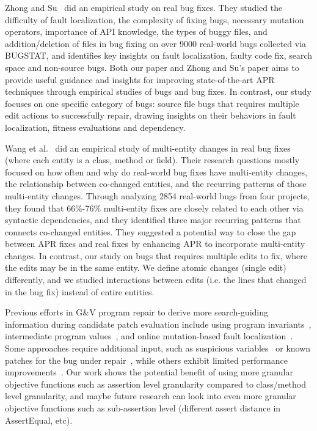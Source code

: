 \documentclass[sigconf, timestamp-false, anonymous=true]{acmart}
\begin{document}
Zhong and Su~\cite{zhong2015} did an empirical study on real bug fixes. 
They studied the difficulty of fault localization, the complexity of fixing bugs, 
necessary mutation operators, importance of API knowledge, the types of buggy files, 
and addition/deletion of files in bug fixing on over 9000 real-world bugs collected via BUGSTAT, 
and identifies key insights on fault localization, faulty code fix, search space and non-source bugs. 
Both our paper and Zhong and Su's paper aims to provide useful guidance and insights for 
improving state-of-the-art APR techniques through empirical studies of bugs and bug fixes. 
In contrast, our study focuses on one specific category of bugs: 
source file bugs that requires multiple edit actions to successfully repair, 
drawing insights on their behaviors in fault localization, fitness evaluations and dependency.

Wang et al.~\cite{wang2018} did an empirical study of multi-entity changes in real bug fixes 
(where each entity is a class, method or field). Their research questions mostly focused on 
how often and why do real-world bug fixes have multi-entity changes, the relationship 
between co-changed entities, and the recurring patterns of those multi-entity changes. 
Through analyzing 2854 real-world bugs from four projects, they found that 66\%-76\% 
multi-entity fixes are closely related to each other via syntactic dependencies, 
and they identified three major recurring patterns that connects co-changed entities. 
They suggested a potential way to close the gap between APR fixes and real fixes by 
enhancing APR to incorporate multi-entity changes. In contrast, our study on bugs that
requires multiple edits to fix, where the edits may be in the same entity. We define atomic 
changes (single edit) differently, and we studied interactions between edits 
(i.e. the lines that changed in the bug fix) instead of entire entities.

Previous efforts in G\&V program repair to derive more search-guiding information 
during candidate patch evaluation 
include using program invariants~\cite{better-fitness, dinglyu}, 
intermediate program values~\cite{source-code-checkpoint}, 
and online mutation-based fault localization~\cite{mut-analysis}.
Some approaches require additional input, such as suspicious variables~\cite{source-code-checkpoint} 
or known patches for the bug under repair~\cite{better-fitness}, 
while others exhibit limited performance improvements~\cite{dinglyu, mut-analysis}.
Our work shows the potential benefit of using more granular objective functions such as
assertion level granularity compared to class/method level granularity, and maybe
future research can look into even more granular objective functions such as sub-assertion
level (different assert distance in AssertEqual, etc).
\end{document}

